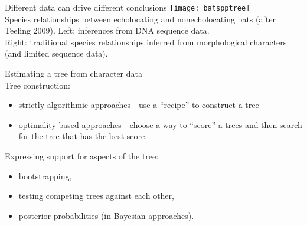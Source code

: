 \documentclass{beamer}
\begin{document}
\begin{frame}
Different data can drive different conclusions
 \texttt{[image: batspptree]}\\
Species relationships between echolocating and nonecholocating bats (after Teeling 2009).
Left: inferences from DNA sequence data.\\
Right: traditional species relationships inferred from morphological characters (and limited sequence data).
\citep{hahn_irrational_2016}
\end{frame}



\begin{frame}
Estimating a tree from character data\\
Tree construction:
\begin{itemize}
 \item strictly algorithmic approaches - use a “recipe” to construct a tree
  \item optimality based approaches - choose a way to “score” a trees and then search for the tree that has the best score.
\end{itemize}

Expressing support for aspects of the tree:
\begin{itemize}
 \item  bootstrapping,
 \item testing competing trees against each other,
 \item posterior probabilities (in Bayesian approaches).
\end{itemize}
\end{frame}


\appendix
\begin{frame}[allowframebreaks]
 
\end{frame}
\end{document}
